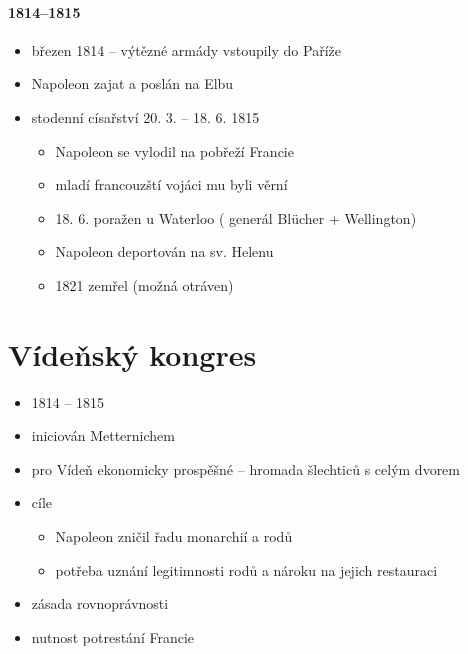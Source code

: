 \paragraph{1814--1815}
\begin{itemize}
\item březen 1814 -- výtězné armády vstoupily do Paříže
\item Napoleon zajat a poslán na Elbu
\item stodenní císařství 20. 3. -- 18. 6. 1815
	\begin{itemize}
	\item Napoleon se vylodil na pobřeží Francie
	\item mladí francouzští vojáci mu byli věrní
	\item 18. 6. poražen u Waterloo  ( generál Blücher + Wellington)
	\item Napoleon deportován na sv. Helenu
	\item 1821 zemřel (možná otráven)
	\end{itemize}
\end{itemize}



\section{Vídeňský kongres}
\begin{itemize}
\item 1814 -- 1815
\item iniciován Metternichem
\item pro Vídeň ekonomicky prospěšné -- hromada šlechticů s celým dvorem
\item cíle
	\begin{itemize}
	\item Napoleon zničil řadu monarchií a rodů
	\item potřeba uznání legitimnosti rodů a nároku na jejich restauraci
	\end{itemize}
\item zásada rovnoprávnosti
\item nutnost potrestání Francie
\end{itemize}

